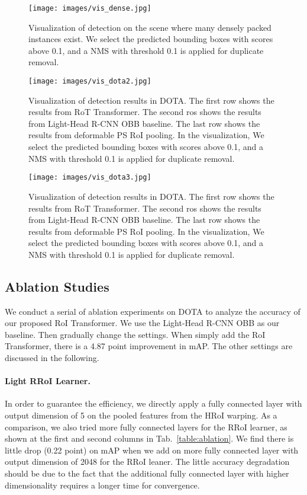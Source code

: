 \documentclass[11pt,onecolumn]{article}         \usepackage[top=3.6cm, bottom=3.2cm, left=2.3cm, right=2.3cm]{geometry}
\begin{document}
 \begin{figure*}[t!]
    \centering
    \texttt{[image: images/vis\_dense.jpg]}
\caption{
    Visualization of detection on the scene where many densely packed instances exist. We select the predicted bounding boxes with scores above 0.1, and a NMS with threshold 0.1 is applied for duplicate removal. 
    }
\vspace{2mm}
    \label{fig:dense_vis}
\end{figure*}
\begin{figure*}[t!]
    \centering
    \texttt{[image: images/vis\_dota2.jpg]}
\caption{
    Visualization of detection results in DOTA. The first row shows the results from RoT Transformer. The second ros shows the results from Light-Head R-CNN OBB baseline. The last row shows the results from deformable PS RoI pooling. In the visualization, We select the predicted bounding boxes with scores above 0.1, and a NMS with threshold 0.1 is applied for duplicate removal.
    }
\label{fig:vis_dota4}
\end{figure*}

\begin{figure*}[t!]
    \centering
    \texttt{[image: images/vis\_dota3.jpg]}
\caption{
    Visualization of detection results in DOTA. The first row shows the results from RoT Transformer. The second ros shows the results from Light-Head R-CNN OBB baseline. The last row shows the results from deformable PS RoI pooling. In the visualization, We select the predicted bounding boxes with scores above 0.1, and a NMS with threshold 0.1 is applied for duplicate removal.
    }
\label{fig:vis_dota3}
\end{figure*}
\subsection{Ablation Studies}
We conduct a serial of ablation experiments on DOTA to analyze the accuracy of our proposed RoI Transformer. We use the Light-Head R-CNN OBB as our baseline. Then gradually change the settings. When simply add the RoI Transformer, there is a 4.87 point improvement in mAP. The other settings are discussed in the following.

\paragraph{Light RRoI Learner.} In order to guarantee the efficiency, we directly apply a fully connected layer with output dimension of 5 on the pooled features from the HRoI warping. As a comparison, we also tried more fully connected layers for the RRoI learner, as shown at the first and second columns in Tab.~\ref{table:ablation}. We find there is little drop (0.22 point) on mAP when we add on more fully connected layer with output dimension of 2048 for the RRoI leaner. The little accuracy degradation should be due to the fact that the additional fully connected layer with higher dimensionality requires a longer time for convergence.
\end{document}
